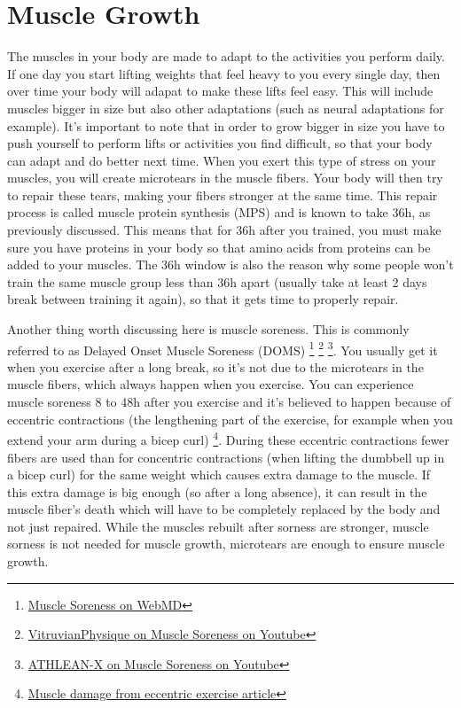 \documentclass[openany, 12pt]{book}
\begin{document}
        \section{Muscle Growth}

        The muscles in your body are made to adapt to the activities you perform daily. If one day you start lifting weights that feel heavy to you every single day, then over time your body will
        adapat to make these lifts feel easy. This will include muscles bigger in size but also other adaptations (such as neural adaptations for example). It's important to note that in order to
        grow bigger in size you have to push yourself to perform lifts or activities you find difficult, so that your body can adapt and do better next time. When you exert this type of stress on
        your muscles, you will create microtears in the muscle fibers. Your body will then try to repair these tears, making your fibers stronger at the same time. This repair process is called
        muscle protein synthesis (MPS) and is known to take 36h, as previously discussed. This means that for 36h after you trained, you must make sure you have proteins in your body so that
        amino acids from proteins can be added to your muscles. The 36h window is also the reason why some people won't train the same muscle group less than 36h apart (usually take at least
        2 days break between training it again), so that it gets time to properly repair.

        Another thing worth discussing here is muscle soreness. This is commonly referred to as Delayed Onset Muscle Soreness (DOMS)
        \footnote{\href{https://www.webmd.com/fitness-exercise/features/sore-muscles-dont-stop-exercising}{Muscle Soreness on WebMD}}
        \footnote{\href{https://www.youtube.com/watch?v=S8PycfGxIxY}{VitruvianPhysique on Muscle Soreness on Youtube}}
        \footnote{\href{https://www.youtube.com/watch?v=vlGZfIgc6Vk}{ATHLEAN-X on Muscle Soreness on Youtube}}. You usually get it when you exercise after a long break,
        so it's not due to the microtears in the muscle fibers, which always happen when you exercise. You can experience muscle soreness 8 to 48h after you exercise and it's believed to
        happen because of eccentric contractions (the lengthening part of the exercise, for example when you extend your arm during a bicep curl)
        \footnote{\href{https://www.ncbi.nlm.nih.gov/pmc/articles/PMC2278966/}{Muscle damage from eccentric exercise article}}. During these eccentric contractions fewer
        fibers are used than for concentric contractions (when lifting the dumbbell up in a bicep curl) for the same weight which causes extra damage to the muscle. If this extra damage is
        big enough (so after a long absence), it can result in the muscle fiber's death which will have to be completely replaced by the body and not just repaired. While the muscles rebuilt
        after sorness are stronger, muscle sorness is not needed for muscle growth, microtears are enough to ensure muscle growth.
\end{document}
